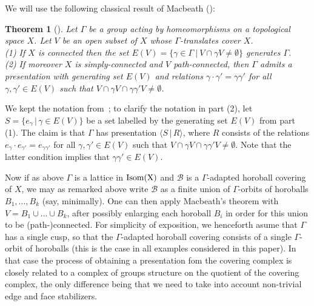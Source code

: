 \documentclass{article}[12pt]
\newcommand{\la}{\langle}
\newcommand{\ra}{\rangle}
\newtheorem{thm}{Theorem}%
\begin{document}
We will use the following classical result of Macbeath (\cite{M}): 
\begin{thm}[\cite{M}]\label{macbeath} Let $\Gamma$ be a group acting by homeomorphisms on a topological space $X$. Let $V$ be an open subset of $X$ whose $\Gamma$-translates cover $X$.\\
(1) If $X$ is connected then the set  $E(V)=\{ \gamma \in \Gamma \ | \ V \cap \gamma V \neq \emptyset \}$ generates $\Gamma$.\\
(2) If moreover $X$ is simply-connected and $V$ path-connected, then $\Gamma$ admits a presentation with generating set $E(V)$ and relations $\gamma \cdot \gamma' = \gamma \gamma'$ for all $\gamma, \gamma' \in E(V)$ such that $V \cap \gamma V  \cap \gamma \gamma' V \neq \emptyset$.
\end{thm}
We kept the notation from~\cite{M}; to clarify the notation in part (2), let $S=\{ e_\gamma \, | \, \gamma \in E(V) \}$ be a set labelled by the generating set $E(V)$ from part (1). The claim is that $\Gamma$ has presentation $\la S \, | \, R \ra$, where $R$ consists of the relations $e_\gamma \cdot e_{\gamma'}=e_{\gamma \gamma'}$ for all $\gamma,\gamma ' \in E(V)$ such that $V \cap \gamma V  \cap \gamma \gamma' V \neq \emptyset$. Note that the latter condition implies that $\gamma \gamma' \in E(V)$.


Now if as above $\Gamma$ is a lattice in ${\rm Isom(X)}$ and $\mathcal{B}$ is a $\Gamma$-adapted horoball covering of $X$, we may as remarked above write $\mathcal{B}$ as a finite union of $\Gamma$-orbits of horoballs $B_1,...,B_k$ (say, minimally). One can then apply Macbeath's theorem with $V=B_1 \cup ... \cup B_k$, after possibly enlarging each horoball $B_i$ in order for this union to be (path-)connected. For simplicity of exposition, we henceforth asume that $\Gamma$ has a single cusp, so that the $\Gamma$-adapted horoball covering consists of a single $\Gamma$-orbit of horoballs (this is the case in all examples considered in this paper). In that case the process of obtaining a presentation fom the covering complex is closely related to a complex of groups structure on the quotient of the covering complex, the only difference being that we need to take into account non-trivial edge and face stabilizers.


\end{document}
